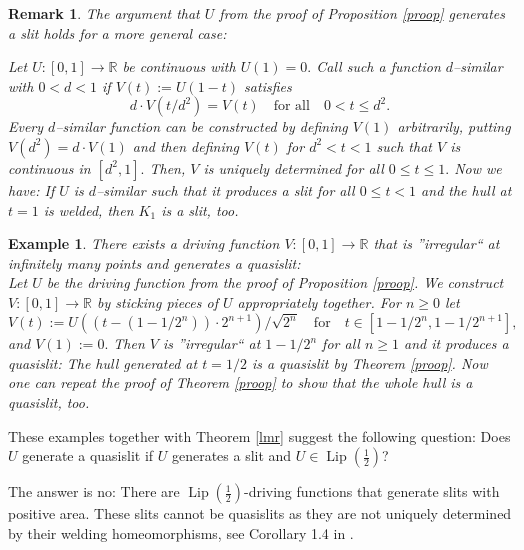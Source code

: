 \documentclass[11pt]{amsart}
\numberwithin{equation}{section}
\theoremstyle{plain}
\newtheorem{example}{Example}
\newtheorem{remark}[theorem]{Remark}
\theoremstyle{definition}
\begin{document}
\begin{remark}
 The argument that $U$ from the proof of Proposition \ref{proop} generates a slit holds for a more general case:

 Let $U:[0,1]\to{\mathbb R}$ be continuous with $U(1)=0.$ Call such a function $d$--similar with $0<d<1$ if $V(t):=U(1-t)$ satisfies $$d\cdot V(t/d^2)=V(t) \quad \text{for all}\quad 0<t\leq d^2.$$ Every $d$--similar function can  be constructed by defining $V(1)$ arbitrarily, putting $V(d^2)=d\cdot V(1)$ and then defining $V(t)$ for $d^2<t<1$ such that $V$ is continuous in $[d^2,1].$ Then, $V$ is uniquely determined for all $0\leq t \leq 1.$ Now we have: \emph{If $U$ is $d$--similar such that it produces a slit for all $0\leq t<1$ and the hull at $t=1$ is welded, then $K_1$ is a slit, too. }
\end{remark}

\begin{example}
 There exists a driving function $V:[0,1]\to{\mathbb R}$ that is ''irregular`` at infinitely many points and generates a quasislit:\\

 Let $U$ be the driving function from the proof of Proposition \ref{proop}. We construct  $V:[0,1]\to{\mathbb R}$ by sticking pieces of $U$ appropriately together. For $n\geq0$ let
$$ V(t):=  U((t-(1-1/2^n))\cdot2^{n+1}) / \sqrt{2^n}
  \quad\text{for}\quad t\in[1-1/2^n, 1-1/2^{n+1}], $$ 
and $V(1):=0.$ Then $V$ is ''irregular`` at $1-1/2^n$ for all $n\geq1$ and it produces a quasislit: The hull generated at $t=1/2$ is a quasislit by Theorem \ref{proop}. Now one can repeat the proof of Theorem \ref{proop} to show that the whole hull is a quasislit, too.
\end{example}

These examples together with Theorem \ref{lmr} suggest the following question:
 Does $U$ generate a quasislit if $U$ generates a slit and $U\in {\operatorname{Lip}\left( \frac{1}{2}\right)}$?

The answer is no: There are ${\operatorname{Lip}\left( \frac{1}{2}\right)}$-driving functions that generate slits with positive area. These slits cannot be quasislits as they are not uniquely determined by their welding homeomorphisms, see Corollary 1.4 in \cite{spacefill}.


\end{document}
